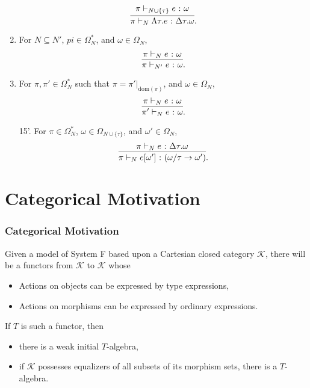 \begin{frame}[allowframebreaks]
\begin{enumerate}
        \[
        \infer{\pi \vdash_N \Lambda\tau. e \colon \Delta\tau. \omega}{\pi \vdash_{N \cup \{\tau\}} e \colon \omega}.
        \]
        \item For $N \subseteq N'$, $pi \in \Omega^*_N$, and $\omega \in \Omega_N$,
        \[
        \infer{\pi \vdash_{N'} e \colon \omega}{\pi \vdash_N e \colon \omega}.
        \]
        \item For $\pi, \pi' \in \Omega^*_N$ such that $\pi = \pi'|_{\mathrm{dom}(\pi)}$, and $\omega \in \Omega_N$,
        \[
        \infer{\pi' \vdash_N e \colon \omega}{\pi \vdash_N e \colon \omega}.
        \]
    \end{enumerate}
    
    \begin{itemize}
        \item [15'.] For $\pi \in \Omega^*_N$, $\omega \in \Omega_{N \cup \{\tau\}}$, and $\omega' \in \Omega_N$,
        \[
        \infer{\pi \vdash_N e[\omega'] \colon (\omega / \tau \rightarrow \omega')}{\pi \vdash_N e \colon \Delta\tau.\omega}.
        \]
    \end{itemize}
\end{frame}

\section{Categorical Motivation}

\begin{frame}[fragile]
    \frametitle{Categorical Motivation}
    
    Given a model of System F based upon a Cartesian closed category $\mathcal{K}$, there will be a functors from $\mathcal{K}$ to $\mathcal{K}$ whose
    \begin{itemize}
        \item Actions on objects can be expressed by type expressions,
        \item Actions on morphisms can be expressed by ordinary expressions.
    \end{itemize}
    
    \vspace{1em}
    If $T$ is such a functor, then
    \begin{itemize}
        \item there is a weak initial $T$-algebra,
        \item if $\mathcal{K}$ possesses equalizers of all subsets of its morphism sets, there is a $T$-algebra.
    \end{itemize}
\end{frame}

